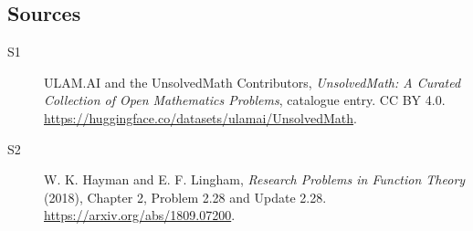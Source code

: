 \documentclass[11pt]{article}
\begin{document}
\subsection{Sources}
\begin{description}
\item[\hypertarget{source:statement:1}{S1}] ULAM.AI and the UnsolvedMath Contributors, \emph{UnsolvedMath: A Curated Collection of Open Mathematics Problems}, catalogue entry. CC BY 4.0. \url{https://huggingface.co/datasets/ulamai/UnsolvedMath}.
\item[\hypertarget{source:statement:2}{S2}] W. K. Hayman and E. F. Lingham, \emph{Research Problems in Function Theory} (2018), Chapter 2, Problem 2.28 and Update 2.28. \url{https://arxiv.org/abs/1809.07200}.
\end{description}
\label{end:statement}
\end{document}
